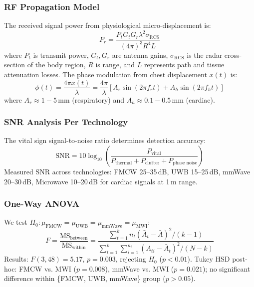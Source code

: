 \documentclass[journal,twoside]{IEEEtran}
\begin{document}
\subsubsection{RF Propagation Model}
The received signal power from physiological micro-displacement is:
\begin{equation}
P_r = \frac{P_t G_t G_r \lambda^2 \sigma_{\text{RCS}}}{(4\pi)^3 R^4 L}
\label{eq:radar_eq}
\end{equation}
where $P_t$ is transmit power, $G_t, G_r$ are antenna gains, $\sigma_{\text{RCS}}$ is the radar cross-section of the body region, $R$ is range, and $L$ represents path and tissue attenuation losses. The phase modulation from chest displacement $x(t)$ is:
\begin{equation}
\phi(t) = \frac{4\pi x(t)}{\lambda} = \frac{4\pi}{\lambda}\left[A_r\sin(2\pi f_r t) + A_h\sin(2\pi f_h t)\right]
\label{eq:phase}
\end{equation}
where $A_r \approx 1{-}5$\,mm (respiratory) and $A_h \approx 0.1{-}0.5$\,mm (cardiac).

\subsubsection{SNR Analysis Per Technology}
The vital sign signal-to-noise ratio determines detection accuracy:
\begin{equation}
\text{SNR} = 10\log_{10}\left(\frac{P_{\text{vital}}}{P_{\text{thermal}} + P_{\text{clutter}} + P_{\text{phase noise}}}\right)
\label{eq:snr_tech}
\end{equation}
Measured SNR across technologies: FMCW 25--35\,dB, UWB 15--25\,dB, mmWave 20--30\,dB, Microwave 10--20\,dB for cardiac signals at 1\,m range.

\subsubsection{One-Way ANOVA}
We test $H_0: \mu_{\text{FMCW}} = \mu_{\text{UWB}} = \mu_{\text{mmWave}} = \mu_{\text{MWI}}$:
\begin{equation}
F = \frac{\text{MS}_{\text{between}}}{\text{MS}_{\text{within}}} = \frac{\sum_{t=1}^{k} n_t (\bar{A}_t - \bar{A})^2/(k-1)}{\sum_{t=1}^{k}\sum_{i=1}^{n_t}(A_{ti}-\bar{A}_t)^2/(N-k)}
\label{eq:anova_b}
\end{equation}
Results: $F(3,48) = 5.17$, $p = 0.003$, rejecting $H_0$ ($p < 0.01$). Tukey HSD post-hoc: FMCW vs. MWI ($p = 0.008$), mmWave vs. MWI ($p = 0.021$); no significant difference within \{FMCW, UWB, mmWave\} group ($p > 0.05$).
\end{document}
